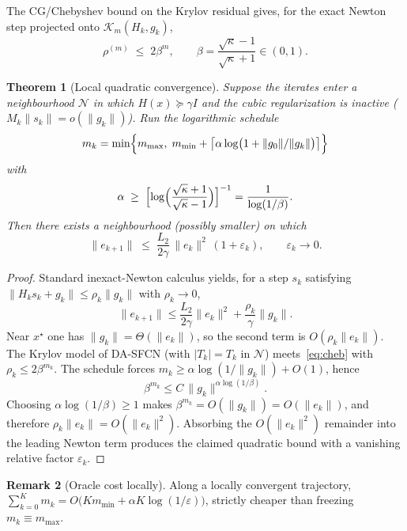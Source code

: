 \documentclass[11pt,a4paper]{article}
\newtheorem{theorem}{Theorem}
\theoremstyle{definition}
\newtheorem{remark}[theorem]{Remark}
\begin{document}
The CG/Chebyshev bound on the Krylov residual
\cite{saad2003,jiang2024} gives, for the exact Newton step projected onto
$\mathcal{K}_m(H_k,g_k)$,
\begin{equation}\label{eq:cheb}
\rho^{(m)}\;\le\;2\beta^m,
\qquad
\beta=\frac{\sqrt{\kappa}-1}{\sqrt{\kappa}+1}\in(0,1).
\end{equation}

\begin{theorem}[Local quadratic convergence]\label{thm:local}
Suppose the iterates enter a neighbourhood $\mathcal{N}$ in which
$H(x)\succeq\gamma I$ and the cubic regularization is inactive
($M_k\|s_k\|=o(\|g_k\|)$). Run the logarithmic schedule
\[
m_k=\min\Bigl\{m_{\max},\;
m_{\min}+\bigl\lceil\alpha\log\bigl(1+\|g_0\|/\|g_k\|\bigr)\bigr\rceil\Bigr\}
\]
with
\[
\alpha\;\ge\;
\Bigl[\log\Bigl(\frac{\sqrt{\kappa}+1}{\sqrt{\kappa}-1}\Bigr)\Bigr]^{-1}
=\frac{1}{\log(1/\beta)}.
\]
Then there exists a neighbourhood (possibly smaller) on which
\[
\|e_{k+1}\|
\;\le\;
\frac{L_2}{2\gamma}\,\|e_k\|^2\,(1+\varepsilon_k),
\qquad\varepsilon_k\to 0.
\]
\end{theorem}

\begin{proof}
Standard inexact-Newton calculus \cite{dembo1982} yields, for a step
$s_k$ satisfying $\|H_k s_k+g_k\|\le\rho_k\|g_k\|$ with $\rho_k\to 0$,
\[
\|e_{k+1}\|
\le
\frac{L_2}{2\gamma}\|e_k\|^2+\frac{\rho_k}{\gamma}\|g_k\|.
\]
Near $x^\star$ one has $\|g_k\|=\Theta(\|e_k\|)$, so the second term is
$O(\rho_k\|e_k\|)$. The Krylov model of DA-SFCN (with $|T_k|=T_k$ in
$\mathcal{N}$) meets~\eqref{eq:cheb} with $\rho_k\le 2\beta^{m_k}$.
The schedule forces
$m_k\ge\alpha\log(1/\|g_k\|)+O(1)$, hence
\[
\beta^{m_k}
\le
C\,\|g_k\|^{\alpha\log(1/\beta)}.
\]
Choosing $\alpha\log(1/\beta)\ge 1$ makes
$\beta^{m_k}=O(\|g_k\|)=O(\|e_k\|)$, and therefore
$\rho_k\|e_k\|=O(\|e_k\|^2)$. Absorbing the $O(\|e_k\|^2)$ remainder into
the leading Newton term produces the claimed quadratic bound with a
vanishing relative factor $\varepsilon_k$.
\end{proof}

\begin{remark}[Oracle cost locally]
Along a locally convergent trajectory,
$\sum_{k=0}^{K}m_k=O\bigl(K m_{\min}+\alpha K\log(1/\varepsilon)\bigr)$,
strictly cheaper than freezing $m_k\equiv m_{\max}$.
\end{remark}
\end{document}
